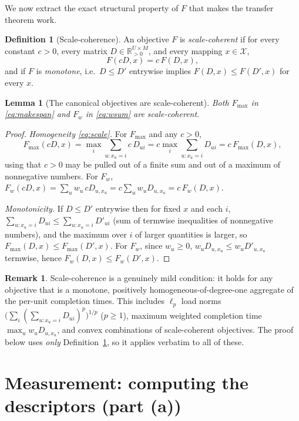\documentclass{amsart}
\newtheorem{lemma}{Lemma}
\theoremstyle{definition}
\newtheorem{definition}{Definition}
\newtheorem{remark}{Remark}
\begin{document}
We now extract the exact structural property of $F$ that makes the transfer
theorem work.

\begin{definition}[Scale-coherence]\label{def:coherent}
An objective $F$ is \emph{scale-coherent} if for every constant $c>0$, every
matrix $D\in\mathbb{R}_{>0}^{U\times M}$, and every mapping $x\in\mathcal{X}$,
\begin{equation}\label{eq:scale}
F(cD, x) = c\, F(D,x),
\end{equation}
and if $F$ is \emph{monotone}, i.e.\ $D\le D'$ entrywise implies
$F(D,x)\le F(D',x)$ for every $x$.
\end{definition}

\begin{lemma}[The canonical objectives are scale-coherent]\label{lem:canonical}
Both $F_{\max}$ in \eqref{eq:makespan} and $F_w$ in \eqref{eq:wsum} are
scale-coherent.
\end{lemma}

\begin{proof}
\emph{Homogeneity \eqref{eq:scale}.} For $F_{\max}$ and any $c>0$,
\[
F_{\max}(cD,x)=\max_{i}\sum_{u:x_u=i} c\,D_{ui}
=c\max_{i}\sum_{u:x_u=i} D_{ui}=c\,F_{\max}(D,x),
\]
using that $c>0$ may be pulled out of a finite sum and out of a maximum of
nonnegative numbers. For $F_w$,
$F_w(cD,x)=\sum_u w_u\, c D_{u,x_u}=c\sum_u w_u D_{u,x_u}=c\,F_w(D,x)$.

\emph{Monotonicity.} If $D\le D'$ entrywise then for fixed $x$ and each $i$,
$\sum_{u:x_u=i}D_{ui}\le\sum_{u:x_u=i}D'_{ui}$ (sum of termwise inequalities of
nonnegative numbers), and the maximum over $i$ of larger quantities is larger, so
$F_{\max}(D,x)\le F_{\max}(D',x)$. For $F_w$, since $w_u\ge0$,
$w_u D_{u,x_u}\le w_u D'_{u,x_u}$ termwise, hence $F_w(D,x)\le F_w(D',x)$.
\end{proof}

\begin{remark}
Scale-coherence is a genuinely mild condition: it holds for any objective that is
a monotone, positively homogeneous-of-degree-one aggregate of the per-unit
completion times. This includes $\ell_p$ load norms
$\big(\sum_i (\sum_{u:x_u=i} D_{ui})^p\big)^{1/p}$ ($p\ge1$), maximum weighted
completion time $\max_u w_u D_{u,x_u}$, and convex combinations of
scale-coherent objectives. The proof below uses \emph{only}
Definition~\ref{def:coherent}, so it applies verbatim to all of these.
\end{remark}

\section{Measurement: computing the descriptors (part (a))}\label{sec:measure}
\end{document}
